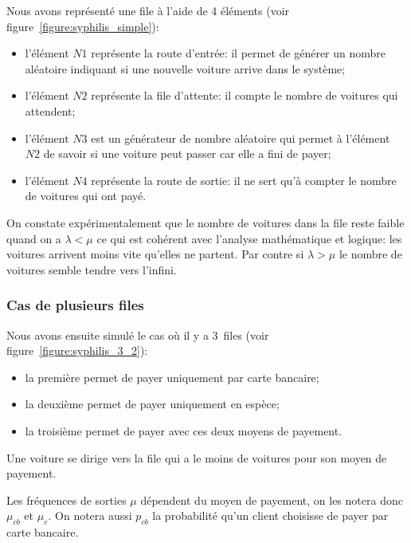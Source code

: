 \documentclass{scrartcl}
\begin{document}
      Nous avons représenté une file à l'aide de 4 éléments (voir
      figure~\ref{figure:syphilis_simple}):
      \begin{itemize}
        \item l'élément $N1$ représente la route d'entrée: il permet de générer
          un nombre aléatoire indiquant si une nouvelle voiture arrive dans le
          système;
        \item l'élément $N2$ représente la file d'attente: il compte le nombre
          de voitures qui attendent;
        \item l'élément $N3$ est un générateur de nombre aléatoire qui permet à
          l'élément $N2$ de savoir si une voiture peut passer car elle a fini
          de payer;
        \item l'élément $N4$ représente la route de sortie: il ne sert qu'à
          compter le nombre de voitures qui ont payé.
      \end{itemize}

      On constate expérimentalement que le nombre de voitures dans la file
      reste faible quand on a $\lambda < \mu$ ce qui est cohérent avec
      l'analyse mathématique et logique: les voitures arrivent moins vite
      qu'elles ne partent. Par contre si $\lambda > \mu$ le nombre de voitures
      semble tendre vers l'infini.

    \subsubsection{Cas de plusieurs files}
      Nous avons ensuite simulé le cas où il y a 3~files (voir
      figure~\ref{figure:syphilis_3_2}):
      \begin{itemize}
        \item la première permet de payer uniquement par carte bancaire;
        \item la deuxième permet de payer uniquement en espèce;
        \item la troisième permet de payer avec ces deux moyens de payement.
      \end{itemize}

      Une voiture se dirige vers la file qui a le moins de voitures pour son
      moyen de payement.

      Les fréquences de sorties $\mu$ dépendent du moyen de payement, on les
      notera donc $\mu_{cb}$ et $\mu_e$. On notera aussi $p_{cb}$ la
      probabilité qu'un client choisisse de payer par carte bancaire.
\end{document}
